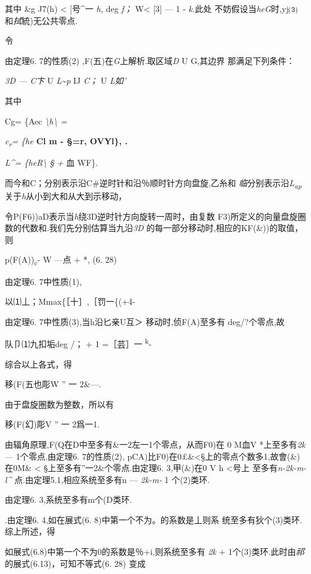 \documentclass{article}
\begin{document}
其中 \&g J7(h) \textless{} {[}号\^{}一 \emph{h,} deg \emph{f；}
W\textless{} {[}3{]} --- 1 - \emph{k.}此处 不妨假设当\emph{heG}时,yj⑶
和\emph{拭}統)无公共零点.

令

由定理6. 7的性质(2) ,F(五)在\emph{G}上解析.取区域\emph{D} U G,其边界
那满足下列条件：

\emph{3D --- C卞} U \emph{L\textasciitilde{}p} IJ \emph{C；} U
\emph{L如'}

其中

Cg= \{Aec\textbar{} \emph{\textbackslash{}h\textbackslash{} =}

\emph{c\textsubscript{r}= \{he} \textbf{Cl m - §\textbar{}=r, OVYl\}, .}

\emph{L\^{}= \{heR\textbackslash{} § +} 血 WF\}.

而今和C；分别表示沿C\#逆时针和沿％顺时针方向盘旋,乙糸和
\emph{临}分别表示沿\emph{L\textsubscript{ap}}关于\emph{h}从小到大和从大到示移动，

令P(F6))aD表示当\emph{h}绕3D逆时针方向旋转一周时，由复数
F3)所定义的向量盘旋圈数的代数和.我们先分别估算当九沿\emph{3D}
的每一部分移动时,相应的KF(\&))的取值，则

p(F(A))\textsubscript{c}- W ---点 + *, (6. 28)

由定理6. 7中性质(1),

以⑴丄；Mmax\{［十］,［罚一\{(+4-

由定理6. 7中性质(3),当h沿匕亲U互＞ 移动时,侦F(A)至多有 deg/?个零点,故

队卩⑴九扣垢deg /； + 1 =［芸］一 \textsuperscript{k}-

综合以上各式，得

移(F(五也彫W '' 一 2\&---.

由于盘旋圈数为整数，所以有

移(F(幻)彫V '' 一 2爲一1.

由辐角原理,F(Q在D中至多有\&一2左一1个零点，从而F0)在 0 M血V
*上至多有\emph{2k} --- 1个零点.由定理6. 7的性质(2),
pCA)比F0)在0£\&\textless{}§上的零点个数多1,故會(\&)在0M\& \textless{}
§上至多有''一2\&个零点.由定理6. 3,甲(\&)在0 V h \textless{}号上
至多有\emph{n-2k-m-l\^{}} 点.由定理5.1,相应系统至多有n --- \emph{2k-m-}
1 个(2)类环.

由定理6. 3,系统至多有m个(D类环.

.由定理6. 4,如在展式(6. 8)中第一个不为。的系数是丄则系
统至多有狄个(3)类环.综上所述，得

如展式(6.8)中第一个不为0的系数是％+i,则系统至多有 \emph{2k} +
1个(3)类环.此时由\emph{祁}的展式(6.13)，可知不等式(6. 28) 变成
\end{document}
